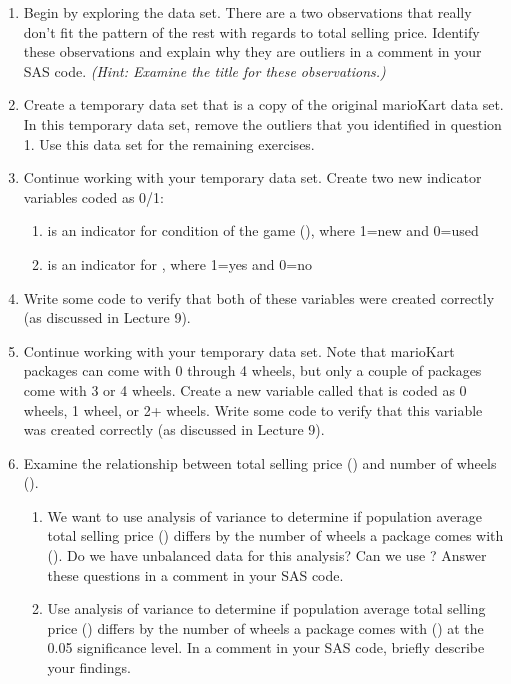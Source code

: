 \begin{enumerate}
\item Begin by exploring the data set.  There are a two observations that really don't fit the pattern of the rest with regards to total selling price.  Identify these observations and explain why they are outliers in a comment in your SAS code. \emph{(Hint: Examine the title for these observations.)}
\item Create a temporary data set that is a copy of the original marioKart data set.  In this temporary data set, remove the outliers that you identified in question 1.  Use this data set for the remaining exercises.
\item Continue working with your temporary data set.  Create two new indicator variables coded as 0/1:
\begin{enumerate}
    \item {}  is an indicator for condition of the game (), where 1=new and 0=used
    \item {}  is an indicator for , where 1=yes and 0=no
\end{enumerate}
\item[] Write some code to verify that both of these variables were created correctly (as discussed in Lecture 9).
\item Continue working with your temporary data set.  Note that marioKart packages can come with 0 through 4 wheels, but only a couple of packages come with 3 or 4 wheels.  Create a new variable called  that is coded as 0 wheels, 1 wheel, or 2+ wheels.  Write some code to verify that this variable was created correctly (as discussed in Lecture 9).
\item
Examine the relationship between total selling price () and number of wheels ().
\begin{enumerate}
\item We want to use analysis of variance to determine if population average total selling price () differs by the number of wheels a package comes with ().  Do we have unbalanced data for this analysis?  Can we use ? Answer these questions in a comment in your SAS code.
\item Use analysis of variance to determine if population average total selling price () differs by the number of wheels a package comes with () at the 0.05 significance level.
In a comment in your SAS code, briefly describe your findings.

\end{enumerate}
\end{enumerate}
